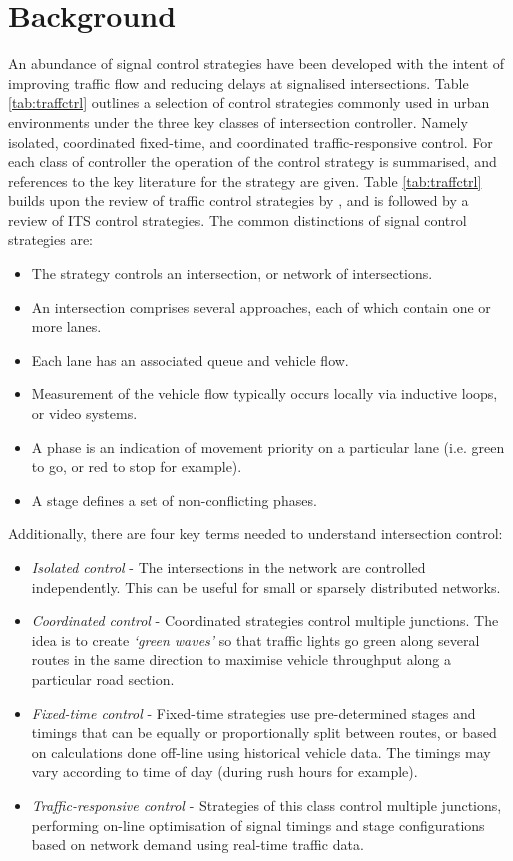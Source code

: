 \documentclass[numbered]{trbunofficial}
\begin{document}
\section{Background}\label{sec:bg}
An abundance of signal control strategies have been developed with the intent of improving traffic flow and reducing delays at signalised intersections. Table \ref{tab:traffctrl} outlines a selection of control strategies commonly used in urban environments under the three key classes of intersection controller. Namely isolated, coordinated fixed-time, and coordinated traffic-responsive control. For each class of controller the operation of the control strategy is summarised, and references to the key literature for the strategy are given. Table \ref{tab:traffctrl} builds upon the review of traffic control strategies by \cite{papageorgiou2003}, and is followed by a review of ITS control strategies. The common distinctions of signal control strategies are:
\begin{itemize}
	\item The strategy controls an intersection, or network of intersections.
	\item An intersection comprises several approaches, each of which contain one or more lanes.
	\item Each lane has an associated queue and vehicle flow.
	\item Measurement of the vehicle flow typically occurs locally via inductive loops, or video systems.
	\item A phase is an indication of movement priority on a particular lane (i.e. green to go, or red to stop for example).
	\item A stage defines a set of non-conflicting phases.
\end{itemize}
Additionally, there are four key terms needed to understand intersection control:
\begin{itemize}
	\item \emph{Isolated control} - The intersections in the network are controlled independently. This can be useful for small or sparsely distributed networks. 
	\item \emph{Coordinated control} - Coordinated strategies control multiple junctions. The idea is to create \emph{`green waves'} so that traffic lights go green along several routes in the same direction to maximise vehicle throughput along a particular road section. 
	\item \emph{Fixed-time control} - Fixed-time strategies use pre-determined stages and timings that can be equally or proportionally split between routes, or based on calculations done off-line using historical vehicle data. The timings may vary according to time of day (during rush hours for example).
	\item \emph{Traffic-responsive control} - Strategies of this class control multiple junctions, performing on-line optimisation of signal timings and stage configurations based on network demand using real-time traffic data. 
\end{itemize}
\end{document}
